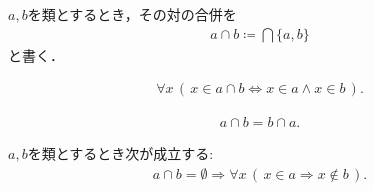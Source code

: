 	$a,b$を類とするとき，その対の合併を
	\begin{align}
		a \cap b \coloneqq \bigcap \{a,b\}
	\end{align}
	と書く．
	
	\begin{screen}
		\begin{thm}
			\begin{align}
				\forall x\, (\, x \in a \cap b \Longleftrightarrow x \in a \wedge x \in b\, ).
			\end{align}
		\end{thm}
	\end{screen}
	
	\begin{screen}
		\begin{thm}[交叉の可換律]
			\begin{align}
				a \cap b = b \cap a.
			\end{align}
		\end{thm}
	\end{screen}
	
	\begin{screen}
		\begin{thm}[対の交叉が空ならばその構成要素は共通元を持たない]
		\label{thm:if_pair_is_empty_then_its_members_do_not_intersect}
			$a,b$を類とするとき次が成立する:
			\begin{align}
				a \cap b = \emptyset \Longrightarrow \forall x\, (\, x \in a \Longrightarrow x \notin b\, ).
			\end{align}
		\end{thm}
	\end{screen}
	
